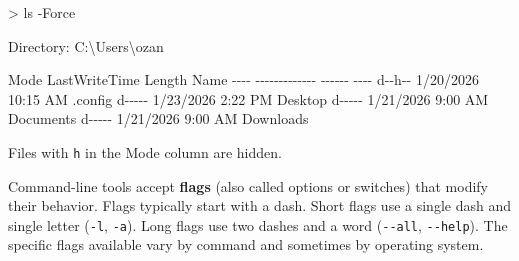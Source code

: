 \documentclass[
  letterpaper,
  DIV=11,
  numbers=noendperiod]{scrreprt}
\newenvironment{Shaded}{\begin{snugshade}}{\end{snugshade}}
\newcommand{\DecValTok}[1]{\textcolor[rgb]{0.68,0.00,0.00}{#1}}
\newcommand{\FunctionTok}[1]{\textcolor[rgb]{0.28,0.35,0.67}{#1}}
\newcommand{\NormalTok}[1]{\textcolor[rgb]{0.00,0.23,0.31}{#1}}
\newcommand{\OperatorTok}[1]{\textcolor[rgb]{0.37,0.37,0.37}{#1}}
\begin{document}
\begin{codelisting}

\caption{\texttt{terminal}}

\begin{Shaded}
\begin{Highlighting}[]
\OperatorTok{\textgreater{}} \FunctionTok{ls} \OperatorTok{{-}}\NormalTok{Force}

\NormalTok{    Directory}\OperatorTok{:}\NormalTok{ C}\OperatorTok{:}\NormalTok{\textbackslash{}Users\textbackslash{}ozan}

\NormalTok{Mode                 LastWriteTime         Length Name}
\OperatorTok{{-}{-}{-}{-}}                 \OperatorTok{{-}{-}{-}{-}{-}{-}{-}{-}{-}{-}{-}{-}{-}}         \OperatorTok{{-}{-}{-}{-}{-}{-}} \OperatorTok{{-}{-}{-}{-}}
\NormalTok{d{-}{-}h{-}{-}        }\DecValTok{1}\OperatorTok{/}\DecValTok{20}\OperatorTok{/}\DecValTok{2026}   \DecValTok{10}\OperatorTok{:}\DecValTok{15}\NormalTok{ AM                }\OperatorTok{.}\FunctionTok{config}
\NormalTok{d{-}{-}{-}{-}{-}        }\DecValTok{1}\OperatorTok{/}\DecValTok{23}\OperatorTok{/}\DecValTok{2026}    \DecValTok{2}\OperatorTok{:}\DecValTok{22}\NormalTok{ PM                Desktop}
\NormalTok{d{-}{-}{-}{-}{-}        }\DecValTok{1}\OperatorTok{/}\DecValTok{21}\OperatorTok{/}\DecValTok{2026}    \DecValTok{9}\OperatorTok{:}\DecValTok{00}\NormalTok{ AM                Documents}
\NormalTok{d{-}{-}{-}{-}{-}        }\DecValTok{1}\OperatorTok{/}\DecValTok{21}\OperatorTok{/}\DecValTok{2026}    \DecValTok{9}\OperatorTok{:}\DecValTok{00}\NormalTok{ AM                Downloads}
\end{Highlighting}
\end{Shaded}

\end{codelisting}

Files with \texttt{h} in the Mode column are hidden.

\begin{tcolorbox}[enhanced jigsaw, opacitybacktitle=0.6, arc=.35mm, colback=white, bottomtitle=1mm, opacityback=0, toprule=.15mm, left=2mm, colbacktitle=quarto-callout-note-color!10!white, breakable, coltitle=black, toptitle=1mm, colframe=quarto-callout-note-color-frame, bottomrule=.15mm, titlerule=0mm, title=\textcolor{quarto-callout-note-color}{\faInfo}\hspace{0.5em}{Flags and Options}, rightrule=.15mm, leftrule=.75mm]

Command-line tools accept \textbf{flags} (also called options or
switches) that modify their behavior. Flags typically start with a dash.
Short flags use a single dash and single letter (\texttt{-l},
\texttt{-a}). Long flags use two dashes and a word (\texttt{-\/-all},
\texttt{-\/-help}). The specific flags available vary by command and
sometimes by operating system.

\end{tcolorbox}
\end{document}
